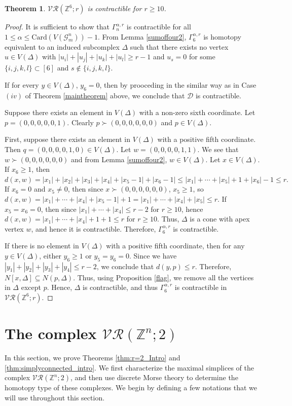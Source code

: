 \documentclass{amsart}
\newtheorem{theorem}{Theorem}[section]
\theoremstyle{definition}
\theoremstyle{remark}
\numberwithin{equation}{section}
\newcommand{\D}{\Delta}
\newcommand{\G}{\mathcal{G}}
\newcommand{\vr}[2]{\mathcal{VR}(#1;#2)}
\def\Z{{\mathbb{Z}}}
\begin{document}
\begin{theorem}\label{thm:n=6(Inside)}
	$\vr{\mathbb{Z}^6}{r}$ is contractible for $r\geq 10$.
\end{theorem}
\begin{proof}
	It is sufficient to show that $\Gamma_{n}^{\alpha,r}$ is contractible for all $ 1 \leq \alpha \leq \mathrm{Card}(V(\G_{m}^n))-1$. From Lemma \ref{sumoffour2}, $\Gamma_6^{\alpha,r}$ is homotopy equivalent to an induced subcomplex $\D$ such that there exists no vertex  $u\in V(\D)$ with $|u_i|+|u_j|+|u_k|+|u_l|\geq r-1$ and $u_s=0$ for some  $\{i,j,k,l\}\subset [6]$ and $s\notin \{i,j,k,l\}$. 
	
	If for every $y \in V(\D)$, $y_6 = 0$, 
    then by prooceding in the similar way as in Case $(iv)$ of Theorem \ref{maintheorem} above, we conclude that $\mathcal{D}$ is contractible.
   
	Suppose there exists an element in $V(\D)$ with a non-zero sixth coordinate. Let $p = (0, 0, 0, 0, 0, 1)$. Clearly $p\succ (0,0,0,0,0,0)$ and $p\in  V(\D)$.
	
	First, suppose there exists an element in $V(\D)$ with a positive fifth coordinate. Then $q = (0, 0, 0, 0, 1, 0) \in  V(\D)$. Let $w = (0, 0, 0, 0, 1, 1)$. We see that $w\succ (0,0,0,0,0,0)$ and from Lemma \ref{sumoffour2}, $w\in V(\D)$.
	Let $x \in V(\D)$.  
	If $x_6 \geq 1$, then $d(x, w) = |x_1| + |x_2| + |x_3| + |x_4| + |x_5 - 1| + |x_6 - 1| \leq |x_1| + \cdots + |x_5| +1+ |x_6|-1 \leq r.$ If $x_6 = 0$ and $x_5 \neq 0$, then since $x\succ (0,0,0,0,0,0)$, $x_5 \geq 1$, so $d(x, w) = |x_1| + \cdots + |x_4| + |x_5 - 1| + 1 = |x_1| + \cdots + |x_4| + |x_5| \leq r.$ If $x_5 = x_6 = 0$, then since $|x_1| + \cdots + |x_4| \leq r - 2$ for $r\geq 10$, hence
	$d(x, w) = |x_1| + \cdots + |x_4| + 1 +1 \leq r$ for $r\geq 10$.  Thus, $\Delta$ is a cone with apex vertex $w$, and hence it is contractible. Therefore,  $\Gamma_6^{\alpha,r}$ is contractible. 
	
	
	If there is no element in $V(\D)$ with a positive fifth coordinate, then for any $y\in V(\D)$, either $y_6\geq 1$ or $y_5=y_6=0$. Since we have $|y_1|+|y_2|+|y_3|+|y_4|\leq r-2$, we conclude that $d(y,p)\leq r$. Therefore, $N[x, \D] \subseteq N(p, \D)$.
	Thus, using Proposition \ref{flag}, we remove all the vertices in $\D$ except $p$. Hence, $\D$ is contractible, and thus $\Gamma_6^{\alpha,r}$ is contractible in $\vr{\Z^6}{r}$.
\end{proof}



\section{The complex  $\vr{\Z^n}{2}$} \label{sec:vr2}
In this section, we prove Theorems \ref{thm:r=2_Intro} and \ref{thm:simplyconnected_intro}. We first characterize the maximal simplices of the complex $\vr{\Z^n}{2}$, and then use discrete Morse theory to determine the homotopy type of these complexes.  We begin by defining a few notations that we will use throughout this section. 
\end{document}
